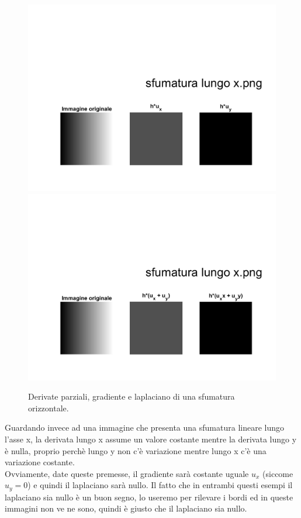 \newpage
\begin{figure}[htb] 
\centering
\includegraphics[scale=0.4, trim = 0 0 0 10.5cm, clip]{Pictures/Risultati/sfumatura lungo x bianco e nero derivate parziali.png}
\includegraphics[scale=0.4, trim = 0 0 0 10.5cm, clip]{Pictures/Risultati/sfumatura lungo x bianco e nero gradiente e laplaciano.png}
\caption{Derivate parziali, gradiente e laplaciano di una sfumatura orizzontale.}\label{fig:figura}
\end{figure}

Guardando invece ad una immagine che presenta una sfumatura lineare lungo l'asse x, la derivata lungo x assume un valore costante mentre la derivata lungo y è nulla, proprio perchè lungo y non c'è variazione mentre lungo x c'è una variazione costante.\\
Ovviamente, date queste premesse, il gradiente sarà costante uguale $u_x$ (siccome $u_y=0$) e quindi il laplaciano sarà nullo.
Il fatto che in entrambi questi esempi il laplaciano sia nullo è un buon segno, lo useremo per rilevare i bordi ed in queste immagini non ve ne sono, quindi è giusto che il laplaciano sia nullo.\\

